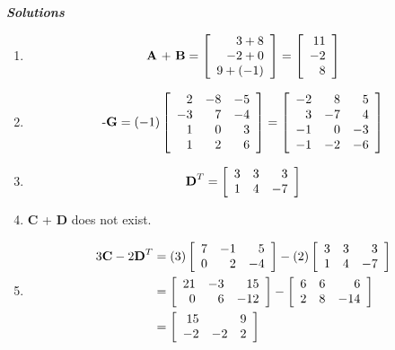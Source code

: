 \documentclass[12pt]{article}
\begin{document}
\textbf{\textit{Solutions}}

\begin{enumerate}
\item $$\textrm{\textbf{A} + \textbf{B}} = \left[\begin{array}{rrr}
3 + 8 \\ -2 + 0 \\ 9 + (-1)\end{array}\right] = \left[\begin{array}{rrr} 11 \\ -2 \\ 8\end{array}\right]$$

\item $$\textrm{-\textbf{G}} = (-1) \left[\begin{array}{rrr} 
2 & -8 & -5\\
-3 & 7 & -4\\
1 & 0 & 3\\
1 & 2 & 6
\end{array}\right] =
\left[\begin{array}{rrr} 
-2 & 8 & 5\\
3 & -7 & 4\\
-1 & 0 & -3\\
-1 & -2 & -6
\end{array}\right]$$

\item $$\textrm{\textbf{D}}^T = \left[\begin{array}{rrr}
3 & 3 & 3\\
1 & 4 & -7\end{array}\right]$$

\item \textbf{C} + \textbf{D} does not exist.

\item \begin{align*}
3\textrm{\textbf{C}} - 2\textrm{\textbf{D}}^T &= 
(3) \left[\begin{array}{rrr}
7 & -1 & 5\\
0 & 2 & -4\end{array}\right] - (2) \left[\begin{array}{rrr}
3 & 3 & 3\\
1 & 4 & -7\end{array}\right] \\
&= \left[\begin{array}{rrr}
21 & -3 & 15\\
0 & 6 & -12\end{array}\right] - \left[\begin{array}{rrr}
6 & 6 & 6\\
2 & 8 & -14\end{array}\right]\\
&= \left[\begin{array}{rrr}
15 &  & 9\\
-2 & -2 & 2\end{array}\right]
\end{align*}


\end{enumerate}
\end{document}
